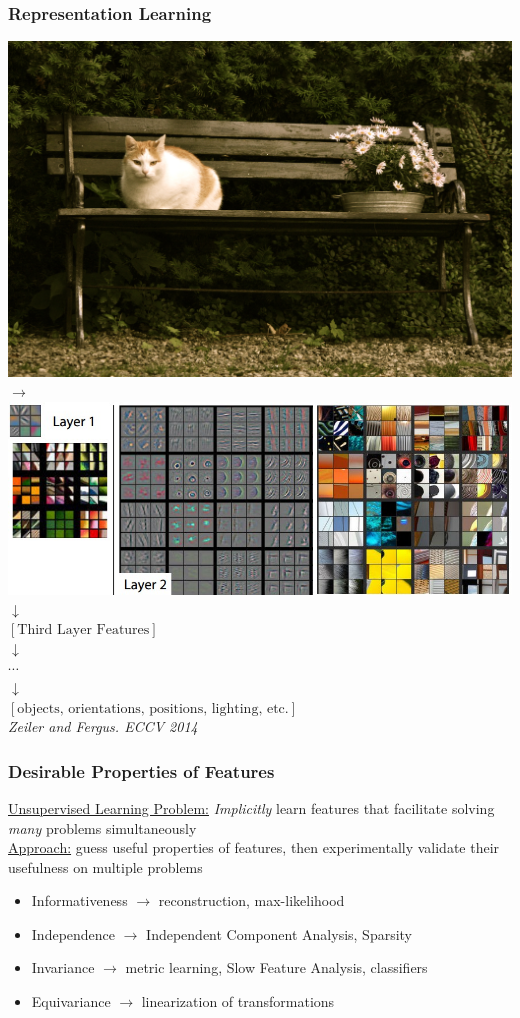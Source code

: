 \documentclass{beamer}
\begin{document}
\begin{frame} 
\frametitle{Representation Learning}
\includegraphics[scale=0.03]{./Figures/cat.jpg} $\rightarrow$ 
\includegraphics[scale=0.25]{./Figures/mattfeatures.jpeg}\\
\centering
$\downarrow$\\
$[\mbox{Third Layer Features}]$\\
$\downarrow$ \\
$\cdots$\\ 
$\downarrow$\\
\centering
$[\mbox{objects, orientations, positions, lighting, etc.}]$\\ \vspace{1.75cm} 
\emph{\tiny{Zeiler and Fergus. ECCV 2014}}
\end{frame} 

\begin{frame} 
\frametitle{Desirable Properties of Features}
\underline{Unsupervised Learning Problem:} \emph{Implicitly} learn features that facilitate solving \emph{many} problems simultaneously \\ \vspace{0.125cm}
\underline{Approach:} guess useful properties of features, then experimentally validate their usefulness on multiple problems
\begin{itemize}
\item{Informativeness $\rightarrow$ reconstruction, max-likelihood}
\item{Independence $\rightarrow$ Independent Component Analysis, Sparsity}
\item{Invariance $\rightarrow$ metric learning, Slow Feature Analysis, classifiers}
\item{Equivariance $\rightarrow$ linearization of transformations} 
\end{itemize} 
\end{frame} 
\end{document}
